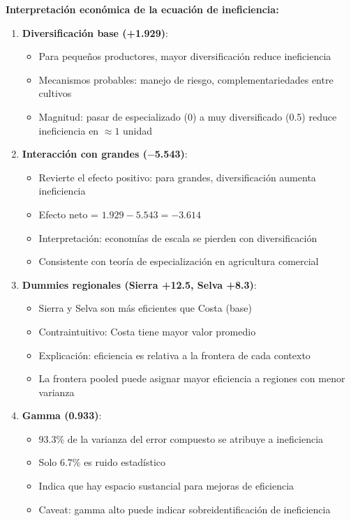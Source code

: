 \documentclass[11pt,a4paper]{article}
\begin{document}
\textbf{Interpretación económica de la ecuación de ineficiencia:}

\begin{enumerate}
    \item \textbf{Diversificación base (+1.929)}:
    \begin{itemize}
        \item Para pequeños productores, mayor diversificación reduce ineficiencia
        \item Mecanismos probables: manejo de riesgo, complementariedades entre cultivos
        \item Magnitud: pasar de especializado (0) a muy diversificado (0.5) reduce ineficiencia en $\approx 1$ unidad
    \end{itemize}
    
    \item \textbf{Interacción con grandes ($-$5.543)}:
    \begin{itemize}
        \item Revierte el efecto positivo: para grandes, diversificación aumenta ineficiencia
        \item Efecto neto = $1.929 - 5.543 = -3.614$
        \item Interpretación: economías de escala se pierden con diversificación
        \item Consistente con teoría de especialización en agricultura comercial
    \end{itemize}
    
    \item \textbf{Dummies regionales (Sierra +12.5, Selva +8.3)}:
    \begin{itemize}
        \item Sierra y Selva son más eficientes que Costa (base)
        \item Contraintuitivo: Costa tiene mayor valor promedio
        \item Explicación: eficiencia es relativa a la frontera de cada contexto
        \item La frontera pooled puede asignar mayor eficiencia a regiones con menor varianza
    \end{itemize}
    
    \item \textbf{Gamma (0.933)}:
    \begin{itemize}
        \item 93.3\% de la varianza del error compuesto se atribuye a ineficiencia
        \item Solo 6.7\% es ruido estadístico
        \item Indica que hay espacio sustancial para mejoras de eficiencia
        \item Caveat: gamma alto puede indicar sobreidentificación de ineficiencia
    \end{itemize}
\end{enumerate}
\end{document}
